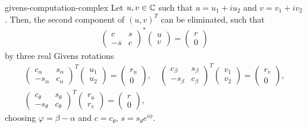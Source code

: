 \begin{Lemma}{givens-computation-complex}
  Let $u,v\in \mathbb C$ such that $u=u_1+iu_2$ and $v=v_1+iv_2$. Then, the second component of $(u,v)^T$ can be eliminated, such that
  \begin{gather}
    \begin{pmatrix}
      c & s\\-\overline s&c
    \end{pmatrix}^*
    \begin{pmatrix}
      u\\v
    \end{pmatrix}
    =
    \begin{pmatrix}
      r\\0
    \end{pmatrix}
  \end{gather}
  by three real Givens rotations
  \begin{gather}
    \begin{pmatrix}
      c_\alpha & s_\alpha\\-s_\alpha & c_\alpha
    \end{pmatrix}^T
    \begin{pmatrix}
      u_1\\u_2
    \end{pmatrix}
    =
    \begin{pmatrix}
      r_u\\0
    \end{pmatrix}
    ,\quad
    \begin{pmatrix}
      c_\beta & s_\beta\\-s_\beta & c_\beta
    \end{pmatrix}^T
    \begin{pmatrix}
      v_1\\v_2
    \end{pmatrix}
    =
    \begin{pmatrix}
      r_v\\0
    \end{pmatrix},
    \\
    \begin{pmatrix}
      c_\theta & s_\theta \\-s_\theta  & c_\theta
    \end{pmatrix}^T
    \begin{pmatrix}
      r_u\\r_v
    \end{pmatrix}
    =
    \begin{pmatrix}
      r\\0
    \end{pmatrix}
    ,
  \end{gather}
  choosing $\varphi = \beta-\alpha$ and $c=c_\theta$,
  $s=s_\theta e^{i\phi}$.
\end{Lemma}

